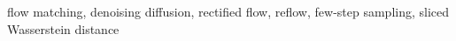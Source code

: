 flow matching, denoising diffusion, rectified flow, reflow, few-step sampling, sliced Wasserstein distance
